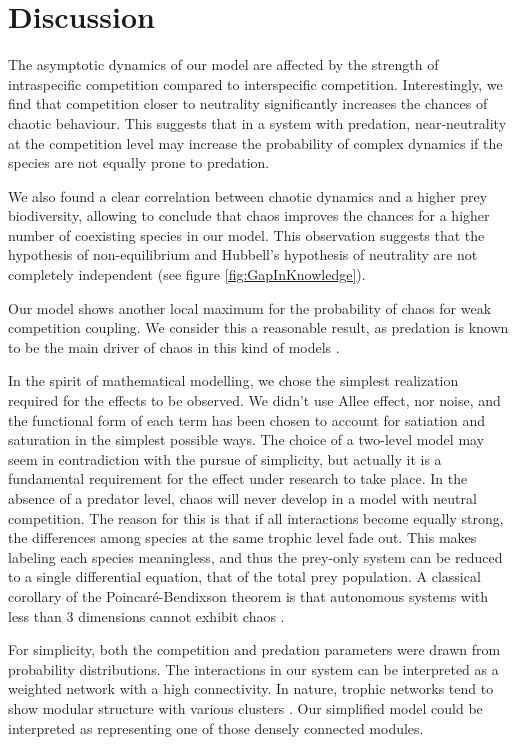 \section{Discussion}
\label{sec:Discussion}
The asymptotic dynamics of our model are affected by the strength of intraspecific competition compared to interspecific competition. Interestingly, we find that competition closer to neutrality significantly increases the chances of chaotic behaviour. This suggests that in a system with predation, near-neutrality at the competition level may increase the probability of complex dynamics if the species are not equally prone to predation.

We also found a clear correlation between chaotic dynamics and a higher prey biodiversity, allowing to conclude that chaos improves the chances for a higher number of coexisting species in our model. This observation suggests that the hypothesis of non-equilibrium \citep{Huisman1999} and Hubbell's hypothesis of neutrality are not completely independent (see figure \ref{fig:GapInKnowledge}). 

Our model shows another local maximum for the probability of chaos for weak competition coupling. We consider this a reasonable result, as predation is known to be the main driver of chaos in this kind of models \citep{Scheffer2004}.

In the spirit of mathematical modelling, we chose the simplest realization required for the effects to be observed. We didn't use Allee effect, nor noise, and the functional form of each term has been chosen to account for satiation and saturation in the simplest possible ways. The choice of a two-level model may seem in contradiction with the pursue of simplicity, but actually it is a fundamental requirement for the effect under research to take place. In the absence of a predator level, chaos will never develop in a model with neutral competition. The reason for this is that if all interactions become equally strong, the differences among species at the same trophic level fade out. This makes labeling each species meaningless, and thus the prey-only system can be reduced to a single differential equation, that of the total prey population. A classical corollary of the Poincaré-Bendixson theorem is that autonomous systems with less than $3$ dimensions cannot exhibit chaos \citep{Strogatz1994}.

For simplicity, both the competition and predation parameters were drawn from probability distributions. The interactions in our system can be interpreted as a weighted network with a high connectivity. In nature, trophic networks tend to show modular structure with various clusters \citep{Thebault2010}. Our simplified model could be interpreted as representing one of those densely connected modules.


